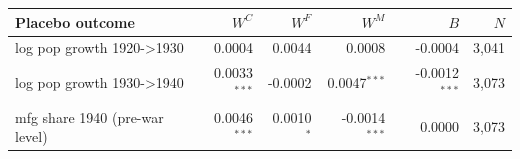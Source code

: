 \begin{tabular}{lrrrrr}
\toprule
Placebo outcome & $W^C$ & $W^F$ & $W^M$ & $B$ & $N$ \\
\midrule
log pop growth 1920->1930 & 0.0004 & 0.0044 & 0.0008 & -0.0004 & 3,041 \\
log pop growth 1930->1940 & 0.0033$^{***}$ & -0.0002 & 0.0047$^{***}$ & -0.0012$^{***}$ & 3,073 \\
mfg share 1940 (pre-war level) & 0.0046$^{***}$ & 0.0010$^{*}$ & -0.0014$^{***}$ & 0.0000 & 3,073 \\
\bottomrule
\end{tabular}